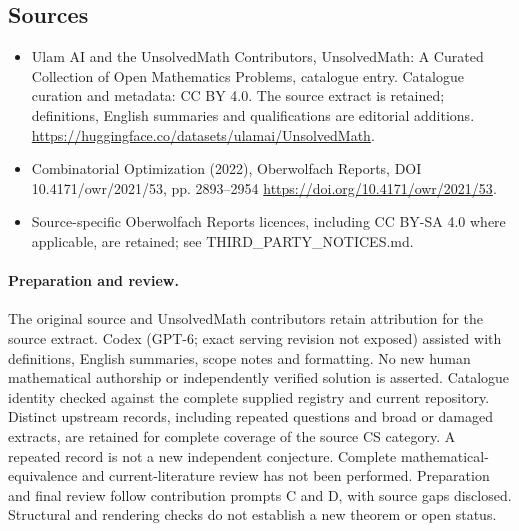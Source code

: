 \documentclass[11pt]{article}
\begin{document}
\subsection{Sources}
\begin{itemize}
\item[\hypertarget{source:statement:1}{S1}] Ulam AI and the UnsolvedMath Contributors, UnsolvedMath: A Curated Collection of Open Mathematics Problems, catalogue entry. Catalogue curation and metadata: CC BY 4.0. The source extract is retained; definitions, English summaries and qualifications are editorial additions.
\url{https://huggingface.co/datasets/ulamai/UnsolvedMath}.
\item[\hypertarget{source:statement:2}{S2}] Combinatorial Optimization (2022), Oberwolfach Reports, DOI 10.4171/owr/2021/53, pp. 2893--2954
\url{https://doi.org/10.4171/owr/2021/53}.
\item Source-specific Oberwolfach Reports licences, including CC BY-SA 4.0 where applicable, are retained; see THIRD\_PARTY\_NOTICES.md.
\end{itemize}
\paragraph{Preparation and review.}
The original source and UnsolvedMath contributors retain attribution for the source extract. Codex (GPT-6; exact serving revision not exposed) assisted with definitions, English summaries, scope notes and formatting. No new human mathematical authorship or independently verified solution is asserted. Catalogue identity checked against the complete supplied registry and current repository. Distinct upstream records, including repeated questions and broad or damaged extracts, are retained for complete coverage of the source CS category. A repeated record is not a new independent conjecture. Complete mathematical-equivalence and current-literature review has not been performed. Preparation and final review follow contribution prompts C and D, with source gaps disclosed. Structural and rendering checks do not establish a new theorem or open status.
\label{end:statement}
\end{document}
